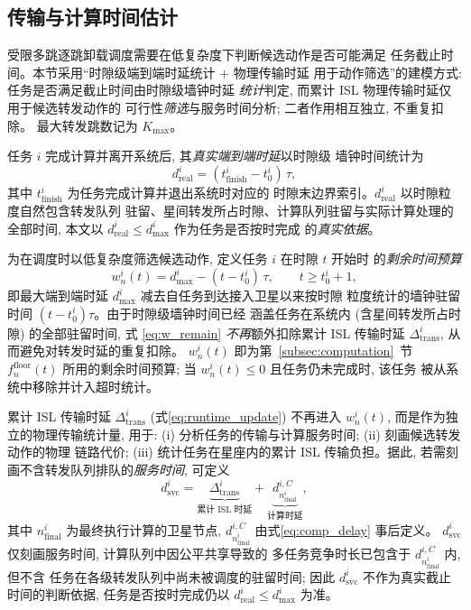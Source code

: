 \documentclass[a4paper,11pt]{article}
\begin{document}
\subsection{传输与计算时间估计}
\label{subsec:est}

受限多跳逐跳卸载调度需要在低复杂度下判断候选动作是否可能满足
任务截止时间。本节采用``时隙级端到端时延统计 $+$ 物理传输时延
用于动作筛选''的建模方式: 任务是否满足截止时间由时隙级墙钟时延
\emph{统计}判定, 而累计 ISL 物理传输时延仅用于候选转发动作的
可行性\emph{筛选}与服务时间分析; 二者作用相互独立, 不重复扣除。
最大转发跳数记为 $K_{\max}$。

任务 $i$ 完成计算并离开系统后, 其\emph{真实端到端时延}以时隙级
墙钟时间统计为
\begin{equation}
    d^i_{\mathrm{real}} = (t^i_{\mathrm{finish}} - t^i_0)\,\tau,
    \label{eq:d_real}
\end{equation}
其中 $t^i_{\mathrm{finish}}$ 为任务完成计算并退出系统时对应的
时隙末边界索引。$d^i_{\mathrm{real}}$ 以时隙粒度自然包含转发队列
驻留、星间转发所占时隙、计算队列驻留与实际计算处理的全部时间,
本文以 $d^i_{\mathrm{real}} \le d^i_{\max}$ 作为任务是否按时完成
的\emph{真实依据}。

为在调度时以低复杂度筛选候选动作, 定义任务 $i$ 在时隙 $t$ 开始时
的\emph{剩余时间预算}
\begin{equation}
    w^i_n(t) = d^i_{\max} - (t - t^i_0)\,\tau,
    \qquad t \ge t^i_0 + 1,
    \label{eq:w_remain}
\end{equation}
即最大端到端时延 $d^i_{\max}$ 减去自任务到达接入卫星以来按时隙
粒度统计的墙钟驻留时间 $(t - t^i_0)\tau$。由于时隙级墙钟时间已经
涵盖任务在系统内 (含星间转发所占时隙) 的全部驻留时间, 式
\eqref{eq:w_remain} \emph{不再}额外扣除累计 ISL 传输时延
$\Delta^i_{\mathrm{trans}}$, 从而避免对转发时延的重复扣除。
$w^i_n(t)$ 即为第~\ref{subsec:computation}~节 $f^{\mathrm{floor}}_n(t)$
所用的剩余时间预算; 当 $w^i_n(t) \le 0$ 且任务仍未完成时, 该任务
被从系统中移除并计入超时统计。

累计 ISL 传输时延 $\Delta^i_{\mathrm{trans}}$ (式\eqref{eq:runtime_update})
不再进入 $w^i_n(t)$, 而是作为独立的物理传输统计量, 用于:
(i) 分析任务的传输与计算服务时间; (ii) 刻画候选转发动作的物理
链路代价; (iii) 统计任务在星座内的累计 ISL 传输负担。据此,
若需刻画不含转发队列排队的\emph{服务时间}, 可定义
\begin{equation}
    d^i_{\mathrm{svc}} =
    \underbrace{\Delta^i_{\mathrm{trans}}}_{\text{累计 ISL 时延}}
    + \underbrace{d^{i,C}_{n^i_{\mathrm{final}}}}_{\text{计算时延}},
    \label{eq:e2e_delay}
\end{equation}
其中 $n^i_{\mathrm{final}}$ 为最终执行计算的卫星节点,
$d^{i,C}_{n^i_{\mathrm{final}}}$ 由式\eqref{eq:comp_delay} 事后定义。
$d^i_{\mathrm{svc}}$ 仅刻画服务时间, 计算队列中因公平共享导致的
多任务竞争时长已包含于 $d^{i,C}_{n^i_{\mathrm{final}}}$ 内, 但不含
任务在各级转发队列中尚未被调度的驻留时间; 因此 $d^i_{\mathrm{svc}}$
不作为真实截止时间的判断依据, 任务是否按时完成仍以
$d^i_{\mathrm{real}} \le d^i_{\max}$ 为准。
\end{document}
